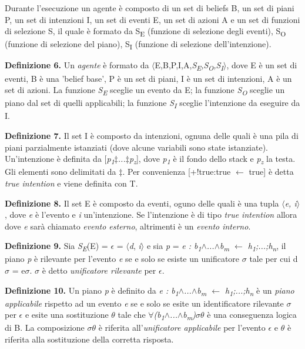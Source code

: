 \bigskip
Durante l'esecuzione un agente \`e composto di un set di beliefs B, un set di piani P, un set di intenzioni I, un set di eventi E, un set di azioni A e un set di funzioni di selezione S, il quale \`e formato da S\textsubscript{E} (funzione di selezione degli eventi), S\textsubscript{O} (funzione di selezione del piano), S\textsubscript{I} (funzione di selezione dell'intenzione).

\smallskip
\textbf{Definizione 6.} Un \textit{agente} \`e formato da $\langle$E,B,P,I,A,\textit{S\textsubscript{E},S\textsubscript{O},S\textsubscript{I}}$\rangle$, dove E \`e un set di eventi, B \`e una 'belief base', P \`e un set di piani, I \`e un set di intenzioni, A \`e un set di azioni. La funzione \textit{S\textsubscript{E}} sceglie un evento da E; la funzione \textit{S\textsubscript{O}} sceglie un piano dal set di quelli applicabili; la funzione \textit{S\textsubscript{I}} sceglie l'intenzione da eseguire da I.

\smallskip
\textbf{Definizione 7.} Il set I \`e composto da intenzioni, ognuna delle quali \`e una pila di piani parzialmente istanziati (dove alcune variabili sono state istanziate). Un'intenzione \`e definita da [\textit{p\textsubscript{1}$\ddagger$...$\ddagger$p\textsubscript{z}}], dove \textit{p\textsubscript{1}} \`e il fondo dello stack e \textit{p\textsubscript{z}} la testa. Gli elementi sono delimitati da $\ddagger$. Per convenienza [+!true:true $\leftarrow$ true] \`e detta \textit{true intention} e viene definita con T.

\smallskip
\textbf{Definizione 8.} Il set E \`e composto da eventi, oguno delle quali \`e una tupla \textit{$\langle$\textit{e}, \textit{i}$\rangle$}, dove \textit{e} \`e l'evento e \textit{i} un'intenzione. Se l'intenzione \`e di tipo \textit{true intention} allora dove \textit{e} sar\`a chiamato \textit{evento esterno}, altrimenti \`e un \textit{evento interno}.

\smallskip
\textbf{Definizione 9.} Sia \textit{S\textsubscript{E}}(E) = \textit{$\epsilon$} = $\langle$\textit{d}, \textit{i}$\rangle$ e sia \textit{p} = \textit{e : b\textsubscript{1}$\land$...$\land$b\textsubscript{m} $\leftarrow$ h\textsubscript{1};...;h\textsubscript{n}}, il piano \textit{p} \`e rilevante per l'evento \textit{e} se e solo se esiste un unificatore $\sigma$ tale per cui d$\sigma$ = e$\sigma$. \textit{$\sigma$} \`e detto \textit{unificatore rilevante} per \textit{$\epsilon$}.

\smallskip
\textbf{Definizione 10.} Un piano \textit{p} \`e definito da \textit{e : b\textsubscript{1}$\land$...$\land$b\textsubscript{m} $\leftarrow$ h\textsubscript{1};...;h\textsubscript{n}} \`e un \textit{piano applicabile} rispetto ad un evento \textit{e} se e solo se esite un identificatore rilevante $\sigma$ per \textit{$\epsilon$} e esite una sostituzione \textit{$\theta$} tale che $\forall$\textit{(b\textsubscript{1}$\land$...$\land$b\textsubscript{m})}\textit{$\sigma\theta$} \`e una conseguenza logica di B. La composizione \textit{$\sigma\theta$} \`e riferita all'\textit{unificatore applicabile} per l'evento \textit{$\epsilon$} e \textit{$\theta$} \`e riferita alla sostituzione della corretta risposta.


